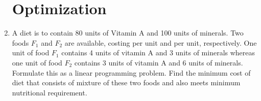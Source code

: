 \documentclass[10pt,-letter paper]{article}
\begin{document}
\begin{enumerate}
\section{Optimization}
\item A diet is to contain 80 units of Vitamin A and 100 units of minerals. Two foods $F_1$ and $F_2$ are available, costing  per unit and  per unit, respectively. One unit of food $F_1$ contains 4 units of vitamin A and 3 units of minerals whereas one unit of food $F_2$ contains 3 units of vitamin A and 6 units of minerals. Formulate this as a linear programming problem. Find the minimum cost of diet that consists of mixture of these two foods and also meets minimum nutritional requirement.
\end{enumerate}
\end{document}
